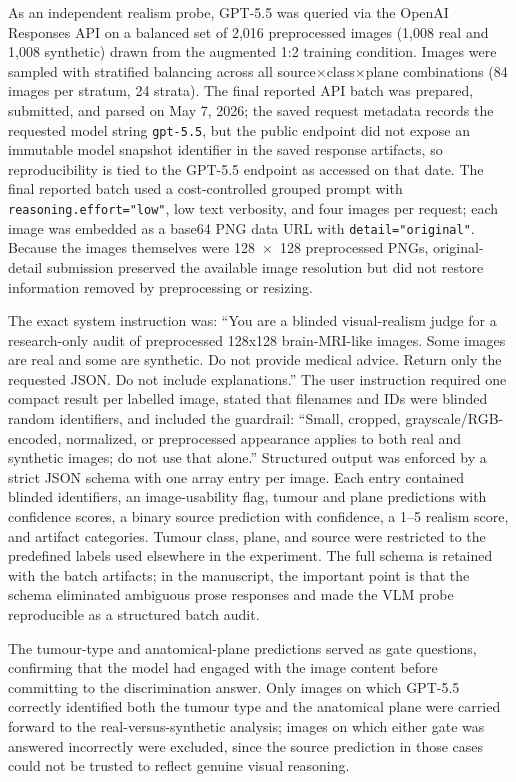 \documentclass[conference,twoside]{IEEEtran}
\begin{document}
As an independent realism probe, GPT-5.5 was queried via the OpenAI Responses API on a balanced set of 2,016 preprocessed images (1,008 real and 1,008 synthetic) drawn from the augmented 1:2 training condition. Images were sampled with stratified balancing across all source$\times$class$\times$plane combinations (84 images per stratum, 24 strata). The final reported API batch was prepared, submitted, and parsed on May 7, 2026; the saved request metadata records the requested model string \texttt{gpt-5.5}, but the public endpoint did not expose an immutable model snapshot identifier in the saved response artifacts, so reproducibility is tied to the GPT-5.5 endpoint as accessed on that date. The final reported batch used a cost-controlled grouped prompt with \texttt{reasoning.effort="low"}, low text verbosity, and four images per request; each image was embedded as a base64 PNG data URL with \texttt{detail="original"}. Because the images themselves were 128~$\times$~128 preprocessed PNGs, original-detail submission preserved the available image resolution but did not restore information removed by preprocessing or resizing.

The exact system instruction was: ``You are a blinded visual-realism judge for a research-only audit of preprocessed 128x128 brain-MRI-like images. Some images are real and some are synthetic. Do not provide medical advice. Return only the requested JSON. Do not include explanations.'' The user instruction required one compact result per labelled image, stated that filenames and IDs were blinded random identifiers, and included the guardrail: ``Small, cropped, grayscale/RGB-encoded, normalized, or preprocessed appearance applies to both real and synthetic images; do not use that alone.'' Structured output was enforced by a strict JSON schema with one array entry per image. Each entry contained blinded identifiers, an image-usability flag, tumour and plane predictions with confidence scores, a binary source prediction with confidence, a 1--5 realism score, and artifact categories. Tumour class, plane, and source were restricted to the predefined labels used elsewhere in the experiment. The full schema is retained with the batch artifacts; in the manuscript, the important point is that the schema eliminated ambiguous prose responses and made the VLM probe reproducible as a structured batch audit.

The tumour-type and anatomical-plane predictions served as gate questions, confirming that the model had engaged with the image content before committing to the discrimination answer. Only images on which GPT-5.5 correctly identified both the tumour type and the anatomical plane were carried forward to the real-versus-synthetic analysis; images on which either gate was answered incorrectly were excluded, since the source prediction in those cases could not be trusted to reflect genuine visual reasoning.
\end{document}
